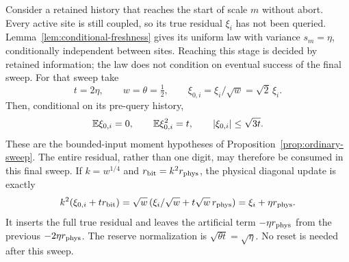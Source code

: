Consider a retained history that reaches the start of scale $m$ without
abort. Every active site is still coupled, so its true residual $\xi_i$
has not been queried. Lemma~\ref{lem:conditional-freshness} gives its
uniform law with variance $s_m=\eta$, conditionally independent between
sites. Reaching this stage is decided by retained information; the law
does not condition on eventual success of the final sweep. For that sweep
take
\[
 t=2\eta,\qquad w=\theta=\tfrac12,\qquad
 \xi_{0,i}=\xi_i/\sqrt w=\sqrt2\,\xi_i.
\]
Then, conditional on its pre-query history,
\[
 \mathbb E \xi_{0,i}=0,\qquad \mathbb E \xi_{0,i}^2=t,\qquad |\xi_{0,i}|\le\sqrt{3t}.
\]
These are the bounded-input moment hypotheses of
Proposition~\ref{prop:ordinary-sweep}.  The entire residual, rather than
one digit, may therefore be consumed in this final sweep.  If
$k=w^{1/4}$ and $r_{\rm bit}=k^2r_{\rm phys}$, the physical diagonal
update is exactly
\[
 k^2(\xi_{0,i}+t r_{\rm bit})
 =\sqrt w\,(\xi_i/\sqrt w+t\sqrt w\,r_{\rm phys})
 =\xi_i+\eta r_{\rm phys}.
\]
It inserts the full true residual and leaves the artificial term
$-\eta r_{\rm phys}$ from the previous $-2\eta r_{\rm phys}$.
The reserve normalization is $\sqrt{\theta t}=\sqrt\eta$.
No reset is needed after this sweep.

